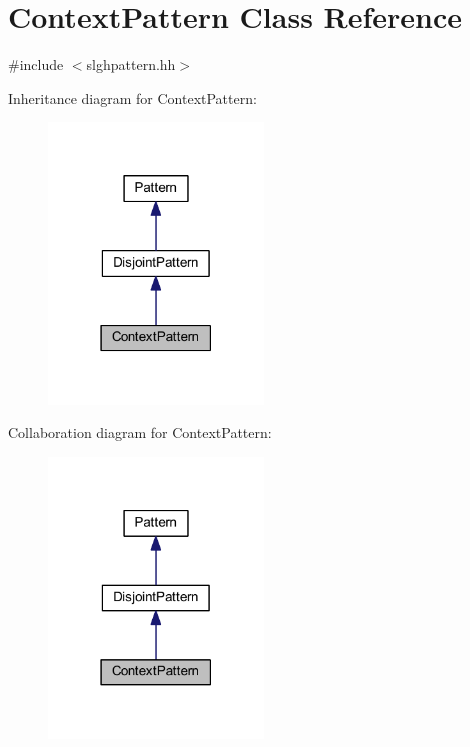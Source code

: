 \hypertarget{class_context_pattern}{}\section{Context\+Pattern Class Reference}
\label{class_context_pattern}


{\ttfamily \#include $<$slghpattern.\+hh$>$}



Inheritance diagram for Context\+Pattern\+:
\nopagebreak
\begin{figure}[H]
\begin{center}
\leavevmode
\includegraphics[width=162pt]{class_context_pattern__inherit__graph}
\end{center}
\end{figure}


Collaboration diagram for Context\+Pattern\+:
\nopagebreak
\begin{figure}[H]
\begin{center}
\leavevmode
\includegraphics[width=162pt]{class_context_pattern__coll__graph}
\end{center}
\end{figure}
